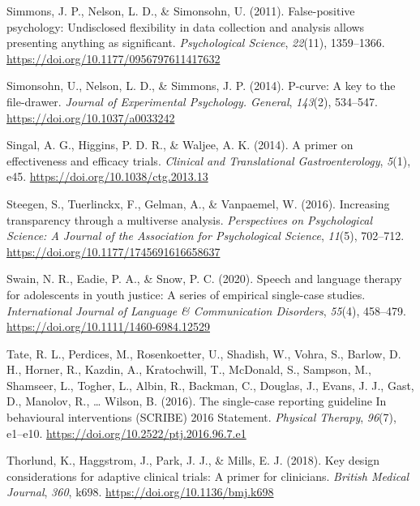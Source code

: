 \documentclass{krantz}
\newlength{\cslhangindent}
\newlength{\cslentryspacingunit} %
\newenvironment{CSLReferences}[2] %
{%
\setlength{\parindent}{0pt}
\ifodd #1
\let\oldpar\par
\def\par{\hangindent=\cslhangindent\oldpar}
\fi
\setlength{\parskip}{#2\cslentryspacingunit}
}%
{}
\begin{document}
\begin{CSLReferences}{1}{0}
\leavevmode{}%
Simmons, J. P., Nelson, L. D., \& Simonsohn, U. (2011). False-positive psychology: {Undisclosed} flexibility in data collection and analysis allows presenting anything as significant. \emph{Psychological Science}, \emph{22}(11), 1359--1366. \url{https://doi.org/10.1177/0956797611417632}

\leavevmode{}%
Simonsohn, U., Nelson, L. D., \& Simmons, J. P. (2014). P-curve: A key to the file-drawer. \emph{Journal of Experimental Psychology. General}, \emph{143}(2), 534--547. \url{https://doi.org/10.1037/a0033242}

\leavevmode{}%
Singal, A. G., Higgins, P. D. R., \& Waljee, A. K. (2014). A primer on effectiveness and efficacy trials. \emph{Clinical and Translational Gastroenterology}, \emph{5}(1), e45. \url{https://doi.org/10.1038/ctg.2013.13}

\leavevmode{}%
Steegen, S., Tuerlinckx, F., Gelman, A., \& Vanpaemel, W. (2016). Increasing transparency through a multiverse analysis. \emph{Perspectives on Psychological Science: A Journal of the Association for Psychological Science}, \emph{11}(5), 702--712. \url{https://doi.org/10.1177/1745691616658637}

\leavevmode{}%
Swain, N. R., Eadie, P. A., \& Snow, P. C. (2020). Speech and language therapy for adolescents in youth justice: {A} series of empirical single-case studies. \emph{International Journal of Language \& Communication Disorders}, \emph{55}(4), 458--479. \url{https://doi.org/10.1111/1460-6984.12529}

\leavevmode{}%
Tate, R. L., Perdices, M., Rosenkoetter, U., Shadish, W., Vohra, S., Barlow, D. H., Horner, R., Kazdin, A., Kratochwill, T., McDonald, S., Sampson, M., Shamseer, L., Togher, L., Albin, R., Backman, C., Douglas, J., Evans, J. J., Gast, D., Manolov, R., \ldots{} Wilson, B. (2016). The single-case reporting guideline {In} behavioural interventions ({SCRIBE}) 2016 {Statement}. \emph{Physical Therapy}, \emph{96}(7), e1--e10. \url{https://doi.org/10.2522/ptj.2016.96.7.e1}

\leavevmode{}%
Thorlund, K., Haggstrom, J., Park, J. J., \& Mills, E. J. (2018). Key design considerations for adaptive clinical trials: A primer for clinicians. \emph{British Medical Journal}, \emph{360}, k698. \url{https://doi.org/10.1136/bmj.k698}


\end{CSLReferences}
\end{document}
